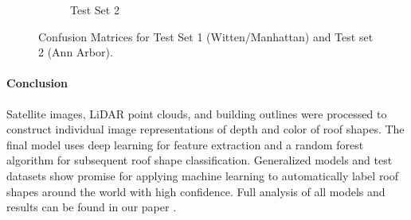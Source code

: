 \begin{figure}[ht]
\begin{subfigure}[t]{0.45\columnwidth}
        \caption{Test Set     2}
        \label{fig:ch1_dual_test_annarbor_cm}
    \end{subfigure}
    \vspace{-1pt}
    \caption{Confusion Matrices for Test Set 1 (Witten/Manhattan) and Test set 2 (Ann Arbor). }
    \label{fig:ch1_dual_tes_cm}
    \hfill
\end{figure}

\vspace{-1cm}
\paragraph{Conclusion}
Satellite images, LiDAR point clouds, and building outlines were processed to construct individual image representations of depth and color of roof shapes.  The final model uses deep learning for feature extraction and a random forest algorithm for subsequent roof shape classification. Generalized models and test datasets show promise for applying machine learning to automatically label roof shapes around the world with high confidence.
Full analysis of all models and results can be found in our paper \cite{castagno_roof_2018}.



